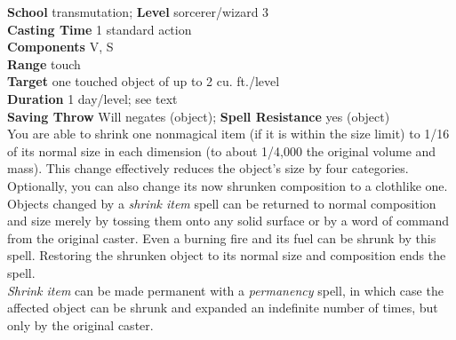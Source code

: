 \textbf{School} transmutation; \textbf{Level} sorcerer/wizard 3\\
\textbf{Casting Time} 1 standard action\\
\textbf{Components} V, S\\
\textbf{Range} touch\\
\textbf{Target} one touched object of up to 2 cu. ft./level\\
\textbf{Duration} 1 day/level; see text\\
\textbf{Saving Throw }Will negates (object); \textbf{Spell Resistance} yes (object)\\
You are able to shrink one nonmagical item (if it is within the size limit) to 1/16 of its normal size in each dimension (to about 1/4,000 the original volume and mass). This change effectively reduces the object's size by four categories. Optionally, you can also change its now shrunken composition to a clothlike one. Objects changed by a \textit{shrink item }spell can be returned to normal composition and size merely by tossing them onto any solid surface or by a word of command from the original caster. Even a burning fire and its fuel can be shrunk by this spell. Restoring the shrunken object to its normal size and composition ends the spell.\\
\textit{Shrink item }can be made permanent with a \textit{permanency }spell, in which case the affected object can be shrunk and expanded an indefinite number of times, but only by the original caster.\\
